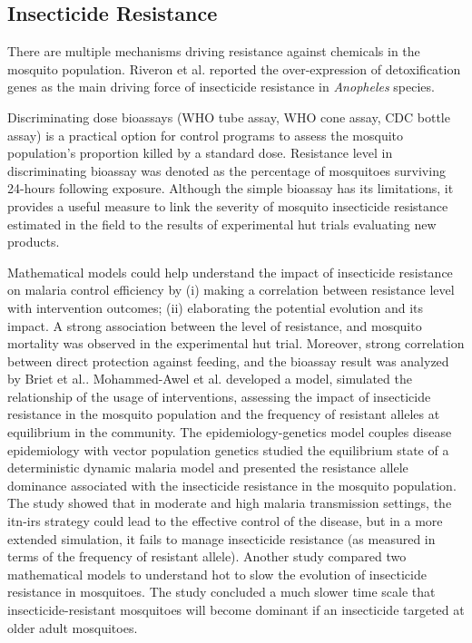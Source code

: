 \documentclass[a4paper, 12pt, twoside]{report}
\begin{document}
\subsection{Insecticide Resistance}
There are multiple mechanisms driving resistance against chemicals in the mosquito population.
Riveron\cite{Riveron2014b} et al. reported the over-expression of detoxification genes as the main driving force of insecticide resistance in \textit{Anopheles} species.

Discriminating dose bioassays (WHO tube assay, WHO cone assay, CDC bottle assay) is a practical option for control programs to assess the mosquito population's proportion killed by a standard dose.
Resistance level in discriminating bioassay was denoted as the percentage of mosquitoes surviving 24-hours following exposure.
Although the simple bioassay has its limitations, it provides a useful measure to link the severity of mosquito insecticide resistance estimated in the field to the results of experimental hut trials evaluating new products.

Mathematical models could help understand the impact of insecticide resistance on malaria control efficiency by (i) making a correlation between resistance level with intervention outcomes; (ii) elaborating the potential evolution and its impact.
A strong association between the level of resistance, and mosquito mortality was observed in the experimental hut trial\cite{Sherrard-Smith2018b}.
Moreover, strong correlation between direct protection against feeding, and the bioassay result was analyzed by Briet et al.\cite{Briet2013}.
Mohammed-Awel et al.\cite{Mohammed-Awel2019} developed a model, simulated the relationship of the usage of interventions, assessing the impact of insecticide resistance in the mosquito population and the frequency of resistant alleles at equilibrium in the community. 
The epidemiology-genetics model couples disease epidemiology with vector population genetics studied the equilibrium state of a deterministic dynamic malaria model and presented the resistance allele dominance associated with the insecticide resistance in the mosquito population.
The study showed that in moderate and high malaria transmission settings, the \gls{itn}-\gls{irs} strategy could lead to the effective control of the disease, but in a more extended simulation, it fails to manage insecticide resistance (as measured in terms of the frequency of resistant allele).
Another study\cite{Gourley2011} compared two mathematical models to understand hot to slow the evolution of insecticide resistance in mosquitoes.
The study concluded a much slower time scale that insecticide-resistant mosquitoes will become dominant if an insecticide targeted at older adult mosquitoes.
\end{document}
